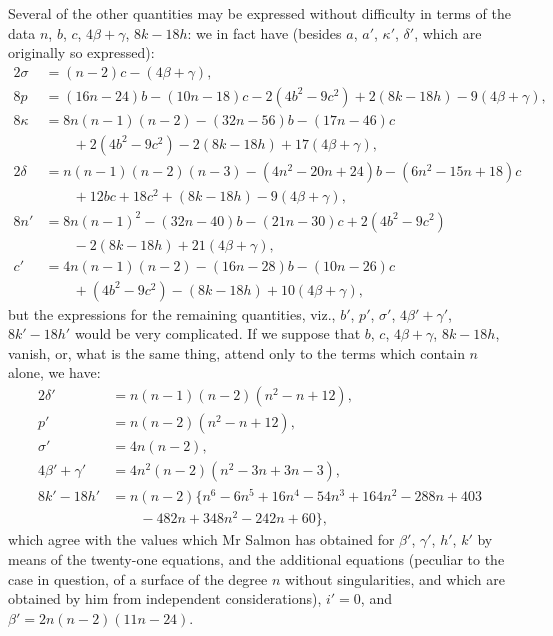 \documentclass[11pt,a4paper]{book}
\theoremstyle{plain}
\begin{document}
Several of the other quantities may be expressed without difficulty in terms of the data $n$, $b$, $c$, $4\beta+\gamma$, $8k-18h$: we in fact have (besides $a$, $a'$, $\kappa'$, $\delta'$, which are originally so expressed):
\begin{align*}
2\sigma &= (n-2)c-(4\beta+\gamma),\\
8p &= (16n-24)b-(10n-18)c-2(4b^2-9c^2)+2(8k-18h)-9(4\beta+\gamma),\\
8\kappa &= 8n(n-1)(n-2)-(32n-56)b-(17n-46)c\\
&\qquad +2(4b^2-9c^2)-2(8k-18h)+17(4\beta+\gamma),\\
2\delta &= n(n-1)(n-2)(n-3)-(4n^2-20n+24)b-(6n^2-15n+18)c\\
&\qquad +12bc+18c^2+(8k-18h)-9(4\beta+\gamma),\\
8n' &= 8n(n-1)^2-(32n-40)b-(21n-30)c+2(4b^2-9c^2)\\
&\qquad -2(8k-18h)+21(4\beta+\gamma),\\
c' &= 4n(n-1)(n-2)-(16n-28)b-(10n-26)c\\
&\qquad +(4b^2-9c^2)-(8k-18h)+10(4\beta+\gamma),
\end{align*}
but the expressions for the remaining quantities, viz., $b'$, $p'$, $\sigma'$, $4\beta'+\gamma'$, $8k'-18h'$ would be very complicated. If we suppose that $b$, $c$, $4\beta+\gamma$, $8k-18h$, vanish, or, what is the same thing, attend only to the terms which contain $n$ alone, we have:
\begin{align*}
2\delta' &= n(n-1)(n-2)(n^2-n+12),\\
p' &= n(n-2)(n^2-n+12),\\
\sigma' &= 4n(n-2),\\
4\beta'+\gamma' &= 4n^2(n-2)(n^2-3n+3n-3),\\
8k'-18h' &= n(n-2)\{n^6-6n^5+16n^4-54n^3+164n^2-288n+403\\
&\qquad -482n+348n^2-242n+60\},
\end{align*}
which agree with the values which Mr Salmon has obtained for $\beta'$, $\gamma'$, $h'$, $k'$ by means of the twenty-one equations, and the additional equations (peculiar to the case in question, of a surface of the degree $n$ without singularities, and which are obtained by him from independent considerations), $i'=0$, and $\beta'=2n(n-2)(11n-24)$.
\end{document}
